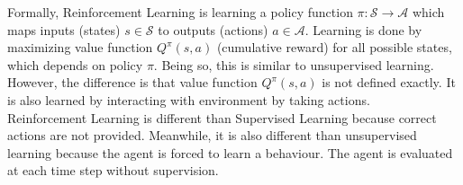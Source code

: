 Formally, Reinforcement Learning is learning a policy function $\pi \colon \mathcal{S} \rightarrow \mathcal{A}$ which maps inputs (states) $s \in \mathcal{S}$ to outputs (actions) $a \in \mathcal{A}$. Learning is done by maximizing value function $Q^{\pi}(s,a)$ (cumulative reward) for all possible states, which depends on policy $\pi$. Being so, this is similar to unsupervised learning. However, the difference is that value function $Q^{\pi}(s,a)$ is not defined exactly. It is also learned by interacting with environment by taking actions. \\
Reinforcement Learning is different than Supervised Learning because correct actions are not provided. Meanwhile, it is also different than unsupervised learning because the agent is forced to learn a behaviour. The agent is evaluated at each time step without supervision.